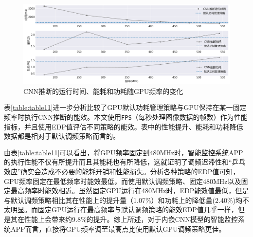 \begin{figure}[htbp]
    \centering
    \includegraphics[width=1.0\textwidth]{figures/system_explore.pdf}
    \caption{CNN推断的运行时间、能耗和功耗随GPU频率的变化}\label{figure:figure38}
\end{figure}

表\ref{table:table11}进一步分析比较了GPU默认功耗管理策略与GPU保持在某一固定频率时执行CNN推断的能效。本文使用\texttt{FPS}（每秒处理图像数据的帧数）作为性能指标，并且使用EDP值评估不同策略的能效。表中的性能提升、能耗和功耗降低数据都是相对于默认调频策略而言的。

\begin{table}[htbp]
  \centering
  \caption{智能监控系统APP在不同调频策略下的能效}
  \label{table:table11}
\end{table}

由表\ref{table:table11}可以看出，将GPU频率固定到480MHz时，智能监控系统APP的执行性能不仅有所提升而且其能耗也有所降低，这就证明了调频迟滞性和“乒乓效应”确实会造成不必要的能耗开销和性能损失。分析各种策略的EDP值可知，GPU频率固定在最低频率时能效最低，而使用默认调频策略、固定480MHz以及固定最高频率时能效相近。虽然固定GPU运行在480MHz时，EDP能效值最低，但是与默认调频策略相比其在性能上的提升量（1.07\%）和功耗上的降低量(2.40\%)均不太明显。而固定GPU运行在最高频率与默认调频策略的能效EDP值几乎一样，但是其在性能上会带来约9.8\%的提升。综上所述，对于内嵌CNN模型的智能监控系统APP而言，直接将GPU频率调至最高点比使用默认GPU调频策略更佳。


